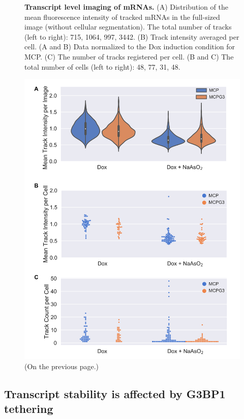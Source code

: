 \vspace*{\fill}
\begin{figure}[b!]
    \centering
    \caption{\textbf{Transcript level imaging of mRNAs.}
        (A) Distribution of the mean fluorescence intensity of tracked
            mRNAs in the full-sized image (without cellular segmentation).
            The total number of tracks (left to right): 715, 1064, 997, 3442.
        (B) Track intensity averaged per cell.
        (A and B) Data normalized to the Dox induction condition for MCP.
        (C) The number of tracks registered per cell.
        (B and C) The total number of cells (left to right): 48, 77, 31, 48.
    }
    \end{figure}
    \addtocounter{figure}{-1}
    \begin{figure} [H]
    \includegraphics[width=\linewidth]{images/figure4}
    \caption{(On the previous page.)}
    \label{fig:mcp_suntag}
\end{figure}


\subsection{Transcript stability is affected by G3BP1 tethering} \label{mcp_treat}

